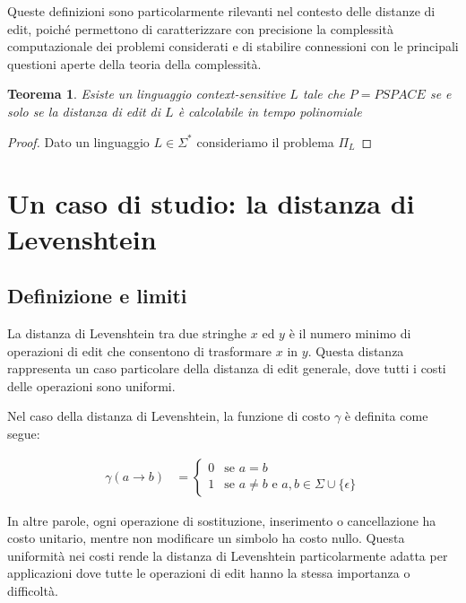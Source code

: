\documentclass[a4paper,12pt]{report}
\newtheorem{theorem}{Teorema}[chapter]
\theoremstyle{propositionstyle}
\begin{document}
    Queste definizioni sono particolarmente rilevanti nel contesto delle distanze di edit, poiché permettono di caratterizzare con precisione la complessità computazionale dei problemi considerati e di stabilire connessioni con le principali questioni aperte della teoria della complessità.

    \begin{theorem}
        Esiste un linguaggio context-sensitive $L$ tale che $P = PSPACE$ se e solo se la distanza di edit di $L$ è calcolabile in tempo polinomiale
    \end{theorem}
    \begin{proof}
        Dato un linguaggio $L \in \Sigma^*$ consideriamo il problema $\Pi_L$
    \end{proof}


    \chapter{Un caso di studio: la distanza di Levenshtein}

    \section{Definizione e limiti}

    La distanza di Levenshtein tra due stringhe $x$ ed $y$ è il numero minimo di operazioni di edit che consentono di trasformare $x$ in $y$. Questa distanza rappresenta un caso particolare della distanza di edit generale, dove tutti i costi delle operazioni sono uniformi.

    Nel caso della distanza di Levenshtein, la funzione di costo $\gamma$ è definita come segue:

    \begin{align}
        \gamma(a \rightarrow b) &= \begin{cases}
                                       0 & \text{se } a = b \\
                                       1 & \text{se } a \neq b \text{ e } a, b \in \Sigma \cup \{\epsilon\}
        \end{cases}
    \end{align}

    In altre parole, ogni operazione di sostituzione, inserimento o cancellazione ha costo unitario, mentre non modificare un simbolo ha costo nullo. Questa uniformità nei costi rende la distanza di Levenshtein particolarmente adatta per applicazioni dove tutte le operazioni di edit hanno la stessa importanza o difficoltà.
\end{document}
